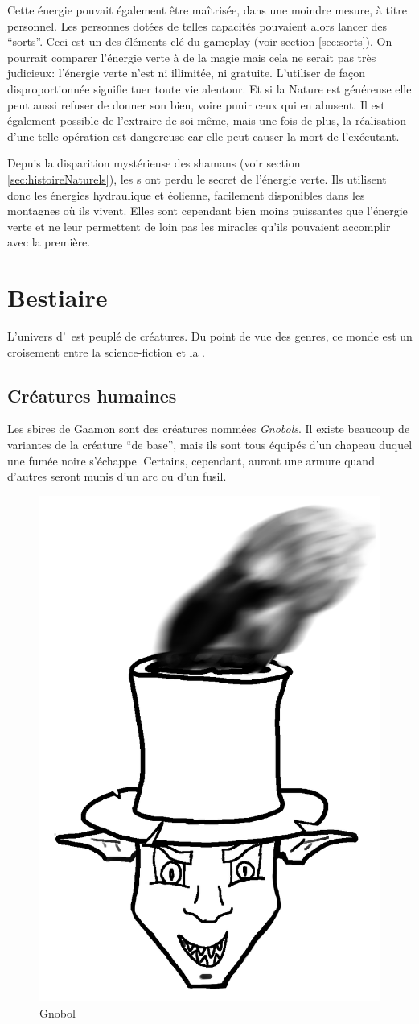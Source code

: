 Cette énergie pouvait également être maîtrisée, dans une moindre mesure, à titre personnel. Les personnes dotées de telles capacités pouvaient alors lancer des \enquote{sorts}. Ceci est un des éléments clé du gameplay (voir section \ref{sec:sorts}). On pourrait comparer l'énergie verte à de la magie mais cela ne serait pas très judicieux: l'énergie verte n'est ni illimitée, ni gratuite. L'utiliser de façon disproportionnée signifie tuer toute vie alentour. Et si la Nature est généreuse elle peut aussi refuser de donner son bien, voire punir ceux qui en abusent. Il est également possible de l'extraire de soi-même, mais une fois de plus, la réalisation d'une telle opération est dangereuse car elle peut causer la mort de l'exécutant.

Depuis la disparition mystérieuse des shamans (voir section \ref{sec:histoireNaturels}), les \nomNaturels s ont perdu le secret de l'énergie verte. Ils utilisent donc les énergies hydraulique et éolienne, facilement disponibles dans les montagnes où ils vivent. Elles sont cependant bien moins puissantes que l'énergie verte et ne leur permettent de loin pas les miracles qu'ils pouvaient accomplir avec la première.

\section{Bestiaire}
\label{sec:Bestiaire}
L'univers d'\nomUnivers\ est peuplé de créatures. Du point de vue des genres, ce monde est un croisement entre la science-fiction et la .

\subsection{Créatures humaines}
Les sbires de Gaamon sont des créatures nommées \textit{Gnobols}. Il existe beaucoup de variantes de la créature \enquote{de base}, mais ils sont tous équipés d'un chapeau duquel une fumée noire s'échappe .Certains, cependant, auront une armure quand d'autres seront munis d'un arc ou d'un fusil.

\begin{figure}[h!]
	\center
	\includegraphics[width=.3\textwidth]{images/Monde/Gnobol.png}
	\caption{Gnobol}
\end{figure}

